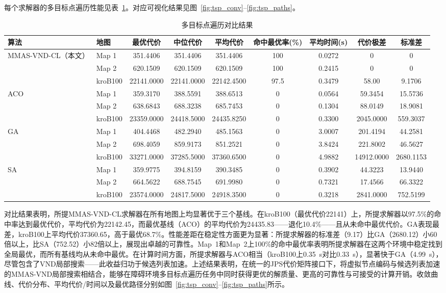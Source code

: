 \documentclass[lettersize,journal]{IEEEtran}
\begin{document}
每个求解器的多目标点遍历性能见表~\ref{tab:tsp_cmp}。对应可视化结果见图~\ref{fig:tsp_conv}--\ref{fig:tsp_paths}。

\begin{table}[!t]

\caption{多目标点遍历对比结果}
\label{tab:tsp_cmp}
\centering
\begin{tabular}{llccccccc}
\toprule
算法 & 地图 & 最优代价 & 中位代价 & 平均代价 & 命中最优率(\%) & 平均时间(s) & 代价极差 & 标准差 \\
\midrule
\multirow{3}{*}{MMAS-VND-CL（本文）}
& Map 1 & 351.4406 & 351.4406 & 351.4406 & 100 & 0.0272 & 0 & 0 \\
& Map 2 & 620.1509 & 620.1509 & 620.1509 & 100 & 0.2415 & 0 & 0 \\
& kroB100 & 22141.0000 & 22141.0000 & 22142.4500 & 97.5 & 0.3479 & 58.00 & 9.1706 \\
\midrule
\multirow{3}{*}{ACO}
& Map 1 & 359.3170 & 388.5591 & 388.6513 & 0 & 0.0564 & 59.3454 & 15.5736 \\
& Map 2 & 638.6843 & 688.3238 & 685.7453 & 0 & 0.1304 & 88.0149 & 18.9081 \\
& kroB100 & 23359.0000 & 24418.5000 & 24435.8250 & 0 & 0.3300 & 2045.0000 & 559.3037 \\
\midrule
\multirow{3}{*}{GA}
& Map 1 & 404.4468 & 482.2940 & 485.1563 & 0 & 3.0007 & 201.4194 & 44.2581 \\
& Map 2 & 698.4059 & 859.9173 & 851.2521 & 0 & 3.8424 & 221.8002 & 46.5627 \\
& kroB100 & 33271.0000 & 37285.5000 & 37360.6500 & 0 & 4.9882 & 14912.0000 & 2680.1153 \\
\midrule
\multirow{3}{*}{SA}
& Map 1 & 359.9775 & 394.8159 & 390.3485 & 0 & 0.3902 & 44.3223 & 13.9440 \\
& Map 2 & 664.5622 & 688.7545 & 691.9980 & 0 & 0.7321 & 17.4566 & 66.3322 \\
& kroB100 & 23574.0000 & 24817.5000 & 24918.3500 & 0 & 0.3218 & 2841.0000 & 752.5199 \\
\bottomrule
\end{tabular}
\end{table}

对比结果表明，所提MMAS-VND-CL求解器在所有地图上均显著优于三个基线。在kroB100（最优代价22141）上，所提求解器以97.5\%的命中率达到最优代价，平均代价为22142.45，而最优基线（ACO）的平均代价为24435.83——退化10.4\%——且从未命中最优代价。GA表现最差，kroB100上平均代价37360.65，高于最优68.7\%。性能差距在稳定性方面更为显著：所提求解器的标准差（9.17）比GA（2680.12）小60倍以上，比SA（752.52）小82倍以上，展现出卓越的可靠性。Map~1和Map~2上100\%的命中最优率表明所提求解器在这两个环境中稳定找到全局最优，而所有基线均从未命中最优。在计算时间方面，所提求解器与ACO相当（kroB100上0.35~s对比0.33~s），显著快于GA（4.99~s），尽管包含了VND局部搜索——此收益归功于候选列表加速。上述结果表明，在统一的JPS代价矩阵接口下，将虚拟节点编码与候选列表加速的MMAS-VND局部搜索相结合，能够在障碍环境多目标点遍历任务中同时获得更优的解质量、更高的可靠性与可接受的计算开销。收敛曲线、代价分布、平均代价/时间以及最优路径分别如图~\ref{fig:tsp_conv}--\ref{fig:tsp_paths}所示。
\end{document}
